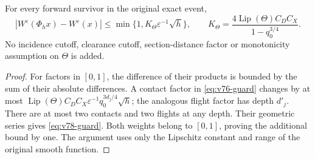 \begin{corollary}
\label{cor:v78-guard}
For every forward survivor in the original exact event,
\begin{equation}\label{eq:v78-guard}
 |W^\varepsilon(\Phi_hx)-W^\varepsilon(x)|
   \le\min\{1,K_\Theta\varepsilon^{-1}\sqrt h\},\qquad
 K_\Theta=\frac{4\operatorname{Lip}(\Theta)C_DC_X}
                         {1-q_0^{3/4}}.
\end{equation}
No incidence cutoff, clearance cutoff, section-distance factor or
monotonicity assumption on $\Theta$ is added.
\end{corollary}
\begin{proof}
For factors in $[0,1]$, the difference of their products is bounded
by the sum of their absolute differences. A contact factor in
\eqref{eq:v76-guard} changes by at most
$\operatorname{Lip}(\Theta)C_DC_X\varepsilon^{-1}
q_0^{3d_j/4}\sqrt h$; the analogous flight factor has depth $d'_j$.
There are at most two contacts and two flights at any depth. Their
geometric series gives \eqref{eq:v78-guard}. Both weights belong
to $[0,1]$, proving the additional bound by one. The argument uses
only the Lipschitz constant and range of the original smooth function.
\end{proof}

